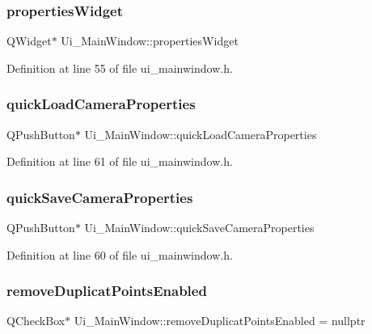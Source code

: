 \subsubsection{\texorpdfstring{propertiesWidget}{propertiesWidget}}
{\footnotesize\ttfamily Q\+Widget$\ast$ Ui\+\_\+\+Main\+Window\+::properties\+Widget}



Definition at line 55 of file ui\+\_\+mainwindow.\+h.

\mbox{\label{class_ui___main_window_a515051950e6949599e5f4ca5b6726c9d}} 
\subsubsection{\texorpdfstring{quickLoadCameraProperties}{quickLoadCameraProperties}}
{\footnotesize\ttfamily Q\+Push\+Button$\ast$ Ui\+\_\+\+Main\+Window\+::quick\+Load\+Camera\+Properties}



Definition at line 61 of file ui\+\_\+mainwindow.\+h.

\mbox{\label{class_ui___main_window_aeb6e0f7819d4ab45e09c419dc26ebcc8}} 
\subsubsection{\texorpdfstring{quickSaveCameraProperties}{quickSaveCameraProperties}}
{\footnotesize\ttfamily Q\+Push\+Button$\ast$ Ui\+\_\+\+Main\+Window\+::quick\+Save\+Camera\+Properties}



Definition at line 60 of file ui\+\_\+mainwindow.\+h.

\mbox{\label{class_ui___main_window_a06b4a9369e5cebdafbdba642fb1681a7}} 
\subsubsection{\texorpdfstring{removeDuplicatPointsEnabled}{removeDuplicatPointsEnabled}}
{\footnotesize\ttfamily Q\+Check\+Box$\ast$ Ui\+\_\+\+Main\+Window\+::remove\+Duplicat\+Points\+Enabled = nullptr}



